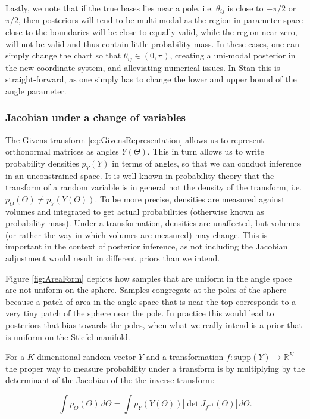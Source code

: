 \documentclass{article}
\begin{document}
Lastly, we note that if the true bases lies near a pole, i.e. $\theta_{ij}$ is close to $-\pi/2$ or $\pi/2$, then posteriors will tend to be multi-modal as the region in parameter space close to the boundaries will be close to equally valid, while the region near zero, will not be valid and thus contain little probability mass. In these cases, one can simply change the chart so that $\theta_{ij} \in (0, \pi)$, creating a uni-modal posterior in the new coordinate system, and alleviating numerical issues. In Stan this is straight-forward, as one simply has to change the lower and upper bound of the angle parameter.

\subsubsection{Jacobian under a change of variables}
The Givens transform \ref{eq:GivensRepresentation} allows us to represent orthonormal matrices as angles $Y(\Theta)$. This in turn allows us to write probability densities $p_Y(Y)$ in terms of angles, so that we can conduct inference in an unconstrained space. It is well known in probability theory that the transform of a random variable is in general not the density of the transform, i.e. $p_\Theta(\Theta) \neq p_Y(Y(\Theta))$\citep[chapt.~2.6]{murphy2012machine}. To be more precise, densities are measured against volumes and integrated to get actual probabilities (otherwise known as probability mass). Under a transformation, densities are unaffected, but volumes (or rather the way in which volumes are measured) may change. This is important in the context of posterior inference, as not including the Jacobian adjustment would result in different priors than we intend.

Figure \ref{fig:AreaForm} depicts how samples that are uniform in the angle space are not uniform on the sphere. Samples congregate at the poles of the sphere because a patch of area in the angle space that is near the top corresponds to a very tiny patch of the sphere near the pole. In practice this would lead to posteriors that bias towards the poles, when what we really intend is a prior that is uniform on the Stiefel manifold.

For a $K$-dimensional random vector $Y$ and a transformation $f: \mathrm{supp}(Y) \to \mathbb{R}^K$ the proper way to measure probability under a transform is by multiplying by the determinant of the Jacobian of the the inverse transform:

\begin{equation}
\int p_\Theta(\Theta)\, d\Theta = \int p_Y(Y(\Theta)) |\det J_{f^{-1}}(\Theta)|\, d\Theta.
\end{equation}
\end{document}
